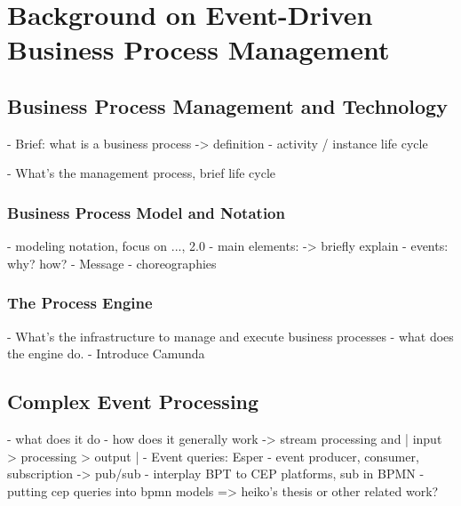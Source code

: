 \chapter{Background on Event-Driven Business Process Management}\label{ch:background}

\section{Business Process Management and Technology}
- Brief: what is a business process
-> definition
- activity / instance life cycle

- What's the management process, brief life cycle

\subsection{Business Process Model and Notation}
- modeling notation, focus on ..., 2.0
- main elements:
-> briefly explain
- events: why? how?
- Message
- choreographies

\subsection{The Process Engine}
- What's the infrastructure to manage and execute business processes
- what does the engine do.
- Introduce Camunda


\section{Complex Event Processing}
- what does it do
- how does it generally work
-> stream processing and | input > processing > output |
- Event queries: Esper
- event producer, consumer, subscription
-> pub/sub
- interplay BPT to CEP platforms, sub in BPMN
- putting cep queries into bpmn models => heiko's thesis or other related work?







